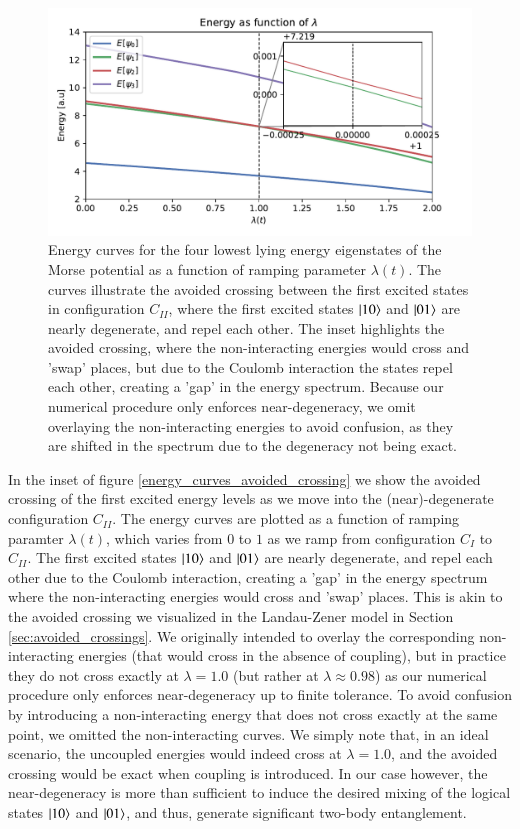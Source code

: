 \documentclass{subfiles}
\begin{document}
\begin{figure}[h!]
  \centering
  \includegraphics[width=1.0\textwidth]{figs/energy_curves_avoided_crossing.pdf}
  \caption{Energy curves for the four lowest lying energy eigenstates of the Morse potential as a function of ramping parameter $\lambda(t)$. The curves illustrate the avoided crossing between the first excited states in configuration $C_{II}$, where the first excited states $\ket{10}$ and $\ket{01}$ are nearly degenerate, and repel each other. The inset highlights the avoided crossing, where the non-interacting energies would cross and 'swap' places, but due to the Coulomb interaction the states repel each other, creating a 'gap' in the energy spectrum. Because our numerical procedure only enforces near-degeneracy, we omit overlaying the non-interacting energies to avoid confusion, as they are shifted in the spectrum due to the degeneracy not being exact. }
  \label{fig:energy_curves_avoided_crossing}
\end{figure}
In the inset of figure \ref{energy_curves_avoided_crossing} we show the avoided crossing of the first excited energy levels as we move into the (near)-degenerate configuration $C_{II}$. The energy curves are plotted as a function of ramping paramter $\lambda(t)$, which varies from $0$ to $1$ as we ramp from configuration $C_I$ to $C_{II}$. The first excited states $\ket{10}$ and $\ket{01}$ are nearly degenerate, and repel each other due to the Coulomb interaction, creating a 'gap' in the energy spectrum where the non-interacting energies would cross and 'swap' places. This is akin to the avoided crossing we visualized in the Landau-Zener model in Section \ref{sec:avoided_crossings}. We originally intended to overlay the corresponding non-interacting energies (that would cross in the absence of coupling), but in practice they do not cross exactly at $\lambda = 1.0$ (but rather at $\lambda \approx 0.98$) as our numerical procedure only enforces near-degeneracy up to finite tolerance. To avoid confusion by introducing a non-interacting energy that does not cross exactly at the same point, we omitted the non-interacting curves. We simply note that, in an ideal scenario, the uncoupled energies would indeed cross at $\lambda = 1.0$, and the avoided crossing would be exact when coupling is introduced. In our case however, the near-degeneracy is more than sufficient to induce the desired mixing of the logical states $\ket{10}$ and $\ket{01}$, and thus, generate significant two-body entanglement.
\\
\end{document}
